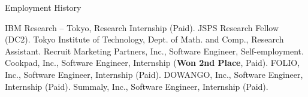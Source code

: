 \begin{rubric}{Employment History}

  \entry*[2021.08 -- 2021.10] IBM Research -- Tokyo, Research Internship (Paid).
  \entry*[2021.04 -- 2023.3] JSPS Research Fellow (DC2).
  \entry*[2020.11 -- 2023.3] Tokyo Institute of Technology, Dept. of Math. and Comp.,
  Research Assistant.
  \entry*[2018.6 -- 2019.2] Recruit Marketing Partners, Inc., Software Engineer,
  Self-employment.
  \entry*[2018.8] Cookpad, Inc., Software Engineer, Internship (\textbf{Won 2nd
    Place}, Paid).
  \entry*[2017.4 -- 2018.3] FOLIO, Inc., Software Engineer, Internship (Paid).
  \entry*[2016.8 -- 2017.3] DOWANGO, Inc., Software Engineer, Internship (Paid).
  \entry*[2016.1 -- 2016.6] Summaly, Inc., Software Engineer, Internship (Paid).
%
\end{rubric}
